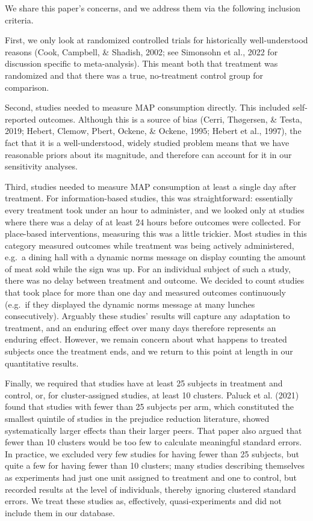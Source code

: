 \documentclass[
  man]{apa6}
\begin{document}
We share this paper's concerns, and we address them via the following inclusion criteria.

First, we only look at randomized controlled trials for historically well-understood reasons (Cook, Campbell, \& Shadish, 2002; see Simonsohn et al., 2022 for discussion specific to meta-analysis). This meant both that treatment was randomized and that there was a true, no-treatment control group for comparison.

Second, studies needed to measure MAP consumption directly. This included self-reported outcomes. Although this is a source of bias (Cerri, Thøgersen, \& Testa, 2019; Hebert, Clemow, Pbert, Ockene, \& Ockene, 1995; Hebert et al., 1997), the fact that it is a well-understood, widely studied problem means that we have reasonable priors about its magnitude, and therefore can account for it in our sensitivity analyses.

Third, studies needed to measure MAP consumption at least a single day after treatment. For information-based studies, this was straightforward: essentially every treatment took under an hour to administer, and we looked only at studies where there was a delay of at least 24 hours before outcomes were collected. For place-based interventions, measuring this was a little trickier. Most studies in this category measured outcomes while treatment was being actively administered, e.g.~a dining hall with a dynamic norms message on display counting the amount of meat sold while the sign was up. For an individual subject of such a study, there was no delay between treatment and outcome. We decided to count studies that took place for more than one day and measured outcomes continuously (e.g.~if they displayed the dynamic norms message at many lunches consecutively). Arguably these studies' results will capture any adaptation to treatment, and an enduring effect over many days therefore represents an enduring effect. However, we remain concern about what happens to treated subjects once the treatment ends, and we return to this point at length in our quantitative results.

Finally, we required that studies have at least 25 subjects in treatment and control, or, for cluster-assigned studies, at least 10 clusters. Paluck et al. (2021) found that studies with fewer than 25 subjects per arm, which constituted the smallest quintile of studies in the prejudice reduction literature, showed systematically larger effects than their larger peers. That paper also argued that fewer than 10 clusters would be too few to calculate meaningful standard errors. In practice, we excluded very few studies for having fewer than 25 subjects, but quite a few for having fewer than 10 clusters; many studies describing themselves as experiments had just one unit assigned to treatment and one to control, but recorded results at the level of individuals, thereby ignoring clustered standard errors. We treat these studies as, effectively, quasi-experiments and did not include them in our database.
\end{document}
